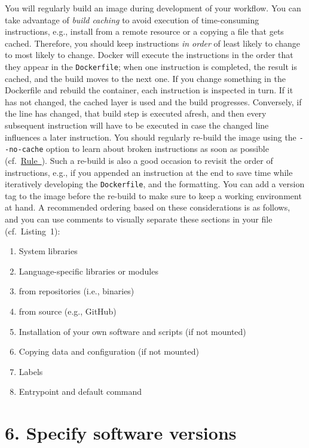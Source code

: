 \documentclass[10pt,letterpaper]{article}
\providecommand{\tightlist}{%
  \setlength{\itemsep}{0pt}\setlength{\parskip}{0pt}}
\begin{document}
You will regularly build an image during development of your workflow.
You can take advantage of \emph{build caching} to avoid execution of
time-consuming instructions, e.g., install from a remote resource or a
copying a file that gets cached. Therefore, you should keep instructions
\emph{in order} of least likely to change to most likely to change.
Docker will execute the instructions in the order that they appear in
the \texttt{Dockerfile}; when one instruction is completed, the result
is cached, and the build moves to the next one. If you change something
in the Dockerfile and rebuild the container, each instruction is
inspected in turn. If it has not changed, the cached layer is used and
the build progresses. Conversely, if the line has changed, that build
step is executed afresh, and then every subsequent instruction will have
to be executed in case the changed line influences a later instruction.
You should regularly re-build the image using the \texttt{-\/-no-cache}
option to learn about broken instructions as soon as possible
(cf.~\hyperref[{rule:usage}]{Rule~}). Such a
re-build is also a good occasion to revisit the order of instructions,
e.g., if you appended an instruction at the end to save time while
iteratively developing the \texttt{Dockerfile}, and the formatting. You
can add a version tag to the image before the re-build to make sure to
keep a working environment at hand. A recommended ordering based on
these considerations is as follows, and you can use comments to visually
separate these sections in your file (cf.~Listing~1):

\begin{enumerate}
\def\labelenumi{\arabic{enumi}.}
\tightlist
\item
  System libraries
\item
  Language-specific libraries or modules
\item
  from repositories (i.e., binaries)
\item
  from source (e.g., GitHub)
\item
  Installation of your own software and scripts (if not mounted)
\item
  Copying data and configuration (if not mounted)
\item
  Labels
\item
  Entrypoint and default command
\end{enumerate}

\hypertarget{specify-software-versions}{%
\section*{6. Specify software
versions}\label{specify-software-versions}}
\end{document}

